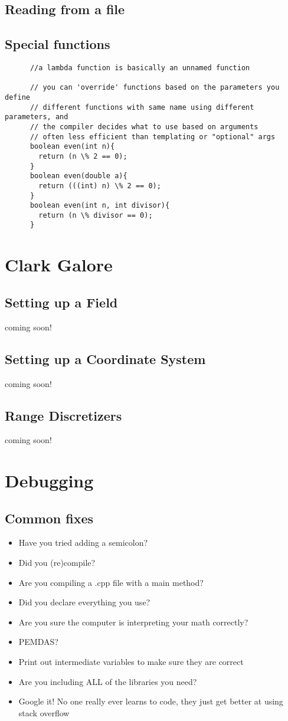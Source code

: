 \documentclass[12pt]{article}
\begin{document}
  \subsection{Reading from a file}
  \subsection{Special functions} %
    \begin{lstlisting}
      //a lambda function is basically an unnamed function
      
      // you can 'override' functions based on the parameters you define
      // different functions with same name using different parameters, and
      // the compiler decides what to use based on arguments
      // often less efficient than templating or "optional" args
      boolean even(int n){
        return (n \% 2 == 0);
      }
      boolean even(double a){
        return (((int) n) \% 2 == 0);
      }
      boolean even(int n, int divisor){
        return (n \% divisor == 0);
      }
    \end{lstlisting}

\section{Clark Galore}
  \subsection{Setting up a Field}
    coming soon!
  \subsection{Setting up a Coordinate System}
    coming soon!
  \subsection{Range Discretizers}
    coming soon!
\section{Debugging}
  \subsection{Common fixes}
    \begin{itemize}
      \item Have you tried adding a semicolon?
      \item Did you (re)compile?
      \item Are you compiling a .cpp file with a main method?
      \item Did you declare everything you use?
      \item Are you sure the computer is interpreting your math correctly?
      \item PEMDAS?
      \item Print out intermediate variables to make sure they are correct
      \item Are you including ALL of the libraries you need?
      \item Google it! No one really ever learns to code, they just get
      better at using stack overflow
    \end{itemize}
\end{document}
